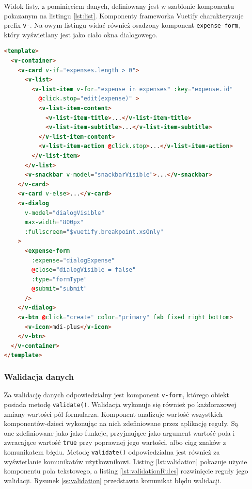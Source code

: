 Widok listy, z pominięciem danych, definiowany jest w szablonie komponentu pokazanym na listingu \ref{lst:list}. Komponenty frameworka Vuetify charakteryzuje prefix \lstinline{v-}. Na owym listingu widać również osadzony komponent \lstinline{expense-form}, który wyświetlany jest jako ciało okna dialogowego.

\begin{lstlisting}[language=HTML, caption={Struktura widoku listy z pominięciem wyświetlania danych.}, label=lst:list]
<template>
  <v-container>
    <v-card v-if="expenses.length > 0">
      <v-list>
        <v-list-item v-for="expense in expenses" :key="expense.id"
          @click.stop="edit(expense)" >
          <v-list-item-content>
            <v-list-item-title>...</v-list-item-title>
            <v-list-item-subtitle>...</v-list-item-subtitle>
          </v-list-item-content>
          <v-list-item-action @click.stop>...</v-list-item-action>
        </v-list-item>
      </v-list>
      <v-snackbar v-model="snackbarVisible">...</v-snackbar>
    </v-card>
    <v-card v-else>...</v-card>
    <v-dialog
      v-model="dialogVisible" 
      max-width="800px"
      :fullscreen="$vuetify.breakpoint.xsOnly"
    >
      <expense-form
        :expense="dialogExpense"
        @close="dialogVisible = false"
        :type="formType"
        @submit="submit"
      />
    </v-dialog>
    <v-btn @click="create" color="primary" fab fixed right bottom>
      <v-icon>mdi-plus</v-icon>
    </v-btn>
  </v-container>
</template>
\end{lstlisting}

\subsubsection{Walidacja danych}
Za walidację danych odpowiedzialny jest komponent \lstinline{v-form}, którego obiekt posiada metodę \mbox{\lstinline{validate()}}. Walidacja wykonuje się również po każdorazowej zmiany wartości pól formularza. Komponent analizuje wartość wszystkich komponentów-dzieci wykonując na nich zdefiniowane przez aplikację reguły. Są one zdefiniowane jako jako funkcje, przyjmujące jako argument wartość pola i zwracające wartość \lstinline{true} przy poprawnej jego wartości, albo ciąg znaków z komunikatem błędu. Metodę \lstinline{validate()} odpowiedzialna jest również za wyświetlanie komunikatów użytkownikowi.
Listing \ref{lst:validation} pokazuje użycie komponentu pola tekstowego, a listing \ref{lst:validationRules} rozwinięcie reguły jego walidacji. Rysunek \ref{ss:validation} przedstawia komunikat błędu walidacji.

